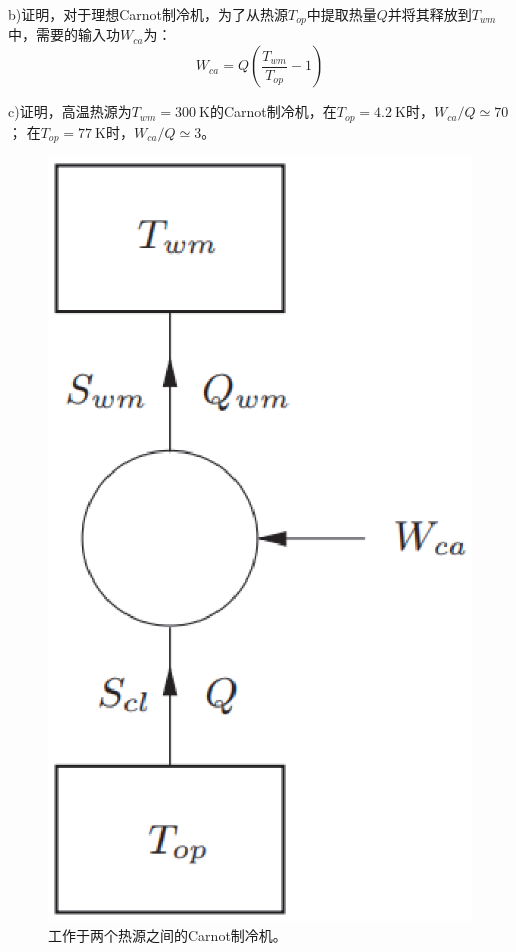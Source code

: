 b)证明，对于理想Carnot制冷机，为了从热源$T_{op}$中提取热量$Q$并将其释放到$T_{wm}$中，需要的输入功$W_{ca}$为：
\begin{equation}%
W_{ca}=Q\left(\frac{T_{wm}}{T_{op}}-1\right)
\end{equation}

c)证明，高温热源为$T_{wm}=300\ \mathrm{K}$的Carnot制冷机，在$T_{op}=4.2\ \mathrm{K}$时，$W_{ca}/Q\simeq 70$；
在$T_{op}=77\ \mathrm{K}$时，$W_{ca}/Q\simeq 3$。
\begin{figure}[htbp]
	\centering
	\includegraphics[scale=0.5]{chpt4/figs/fig4.3.eps}
	\caption{工作于两个热源之间的Carnot制冷机。}
\end{figure}

